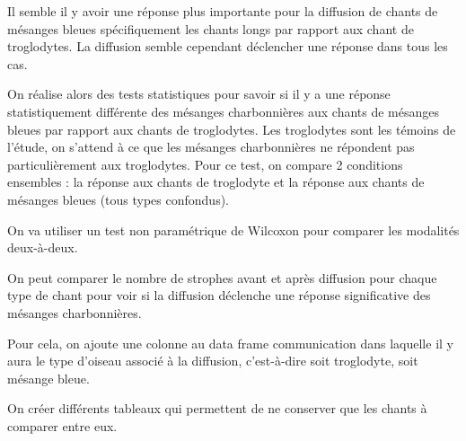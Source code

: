 \documentclass[
  french,
]{article}
\newenvironment{Shaded}{\begin{snugshade}}{\end{snugshade}}
\newcommand{\ControlFlowTok}[1]{\textcolor[rgb]{0.13,0.29,0.53}{\textbf{#1}}}
\newcommand{\DecValTok}[1]{\textcolor[rgb]{0.00,0.00,0.81}{#1}}
\newcommand{\FunctionTok}[1]{\textcolor[rgb]{0.13,0.29,0.53}{\textbf{#1}}}
\newcommand{\NormalTok}[1]{#1}
\newcommand{\OtherTok}[1]{\textcolor[rgb]{0.56,0.35,0.01}{#1}}
\newcommand{\SpecialCharTok}[1]{\textcolor[rgb]{0.81,0.36,0.00}{\textbf{#1}}}
\newcommand{\StringTok}[1]{\textcolor[rgb]{0.31,0.60,0.02}{#1}}
\begin{document}
Il semble il y avoir une réponse plus importante pour la diffusion de
chants de mésanges bleues spécifiquement les chants longs par rapport
aux chant de troglodytes. La diffusion semble cependant déclencher une
réponse dans tous les cas.

On réalise alors des tests statistiques pour savoir si il y a une
réponse statistiquement différente des mésanges charbonnières aux chants
de mésanges bleues par rapport aux chants de troglodytes. Les
troglodytes sont les témoins de l'étude, on s'attend à ce que les
mésanges charbonnières ne répondent pas particulièrement aux
troglodytes. Pour ce test, on compare 2 conditions ensembles : la
réponse aux chants de troglodyte et la réponse aux chants de mésanges
bleues (tous types confondus).

On va utiliser un test non paramétrique de Wilcoxon pour comparer les
modalités deux-à-deux.

On peut comparer le nombre de strophes avant et après diffusion pour
chaque type de chant pour voir si la diffusion déclenche une réponse
significative des mésanges charbonnières.

Pour cela, on ajoute une colonne au data frame communication dans
laquelle il y aura le type d'oiseau associé à la diffusion, c'est-à-dire
soit troglodyte, soit mésange bleue.

\begin{Shaded}
\end{Shaded}

On créer différents tableaux qui permettent de ne conserver que les
chants à comparer entre eux.
\end{document}
